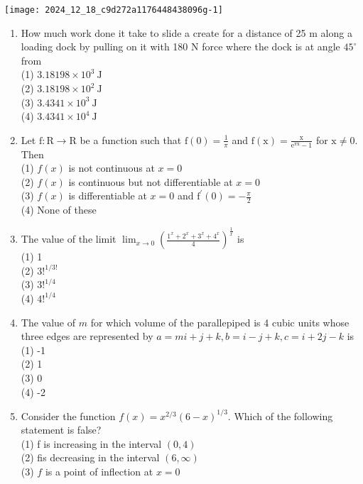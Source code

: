 \documentclass[10pt]{article}
\begin{document}
\begin{center}
\texttt{[image: 2024\_12\_18\_c9d272a1176448438096g-1]}
\end{center}

\begin{enumerate}
  \item How much work done it take to slide a create for a distance of 25 m along a loading dock by pulling on it with 180 N force where the dock is at angle $45^{\circ}$ from\\
(1) $3.18198 \times 10^{3} \mathrm{~J}$\\
(2) $3.18198 \times 10^{2} \mathrm{~J}$\\
(3) $3.4341 \times 10^{3} \mathrm{~J}$\\
(4) $3.4341 \times 10^{4} \mathrm{~J}$
  \item Let $\mathrm{f}: \mathrm{R} \rightarrow \mathrm{R}$ be a function such that $\mathrm{f}(0)=\frac{1}{\pi}$ and $\mathrm{f}(\mathrm{x})=\frac{\mathrm{x}}{\mathrm{e}^{\pi \mathrm{x}}-1}$ for $\mathrm{x} \neq 0$. Then\\
(1) $f(x)$ is not continuous at $x=0$\\
(2) $f(x)$ is continuous but not differentiable at $x=0$\\
(3) $f(x)$ is differentiable at $x=0$ and $\mathrm{f}^{\prime}(0)=-\frac{\pi}{2}$\\
(4) None of these
  \item The value of the limit $\lim _{x \rightarrow 0}\left(\frac{1^{x}+2^{x}+3^{x}+4^{x}}{4}\right)^{\frac{1}{x}}$ is\\
(1) 1\\
(2) $3!^{1 / 3!}$\\
(3) $3!^{1 / 4}$\\
(4) $4!^{1 / 4}$
  \item The value of $m$ for which volume of the parallepiped is 4 cubic units whose three edges are represented by $a=m i+j+k, b=i-j+k, c=i+2 j-k$ is\\
(1) -1\\
(2) 1\\
(3) 0\\
(4) -2
  \item Consider the function $f(x)=x^{2 / 3}(6-x)^{1 / 3}$. Which of the following statement is false?\\
(1) f is increasing in the interval $(0,4)$\\
(2) fis decreasing in the interval $(6, \infty)$\\
(3) $f$ is a point of inflection at $x=0$\\

\end{enumerate}
\end{document}
